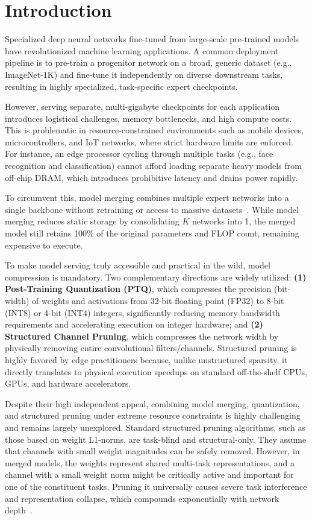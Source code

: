 \documentclass{article}
\theoremstyle{plain}
\theoremstyle{definition}
\theoremstyle{remark}
\begin{document}
\section{Introduction}
\label{sec:intro}
Specialized deep neural networks fine-tuned from large-scale pre-trained models have revolutionized machine learning applications. A common deployment pipeline is to pre-train a progenitor network on a broad, generic dataset (e.g., ImageNet-1K) and fine-tune it independently on diverse downstream tasks, resulting in highly specialized, task-specific expert checkpoints.

However, serving separate, multi-gigabyte checkpoints for each application introduces logistical challenges, memory bottlenecks, and high compute costs. This is problematic in resource-constrained environments such as mobile devices, microcontrollers, and IoT networks, where strict hardware limits are enforced. For instance, an edge processor cycling through multiple tasks (e.g., face recognition and classification) cannot afford loading separate heavy models from off-chip DRAM, which introduces prohibitive latency and drains power rapidly.

To circumvent this, model merging combines multiple expert networks into a single backbone without retraining or access to massive datasets~\cite{wortsman2022model,ilharco2022editing}. While model merging reduces static storage by consolidating $K$ networks into 1, the merged model still retains 100\% of the original parameters and FLOP count, remaining expensive to execute.

To make model serving truly accessible and practical in the wild, model compression is mandatory. Two complementary directions are widely utilized: \textbf{(1) Post-Training Quantization (PTQ)}, which compresses the precision (bit-width) of weights and activations from 32-bit floating point (FP32) to 8-bit (INT8) or 4-bit (INT4) integers, significantly reducing memory bandwidth requirements and accelerating execution on integer hardware; and \textbf{(2) Structured Channel Pruning}, which compresses the network width by physically removing entire convolutional filters/channels. Structured pruning is highly favored by edge practitioners because, unlike unstructured sparsity, it directly translates to physical execution speedups on standard off-the-shelf CPUs, GPUs, and hardware accelerators.

Despite their high independent appeal, combining model merging, quantization, and structured pruning under extreme resource constraints is highly challenging and remains largely unexplored. Standard structured pruning algorithms, such as those based on weight L1-norms, are task-blind and structural-only. They assume that channels with small weight magnitudes can be safely removed. However, in merged models, the weights represent shared multi-task representations, and a channel with a small weight norm might be critically active and important for one of the constituent tasks. Pruning it universally causes severe task interference and representation collapse, which compounds exponentially with network depth~\cite{anonymous2026a,anonymous2026b}.
\end{document}
